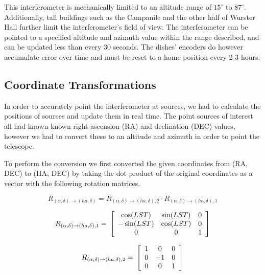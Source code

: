\documentclass{article}
\begin{document}
  This interferometer is mechanically limited to an altitude range of
  $15^{\circ}$ to $87^{\circ}$. Additionally, tall buildings such as the
  Campanile and the other half of Wurster Hall further limit the
  interferometer's field of view. The interferometer can be pointed to a
  specified altitude and azimuth value within the range described, and can be
  updated less than every 30 seconds. The dishes' encoders do however
  accumulate error over time and must be reset to a home position every 2-3
  hours.

  \subsection{Coordinate Transformations}
  In order to accurately point the interferometer at sources, we had to
  calculate the positions of sources and update them in real time. The point
  sources of interest all had known known right ascension (RA) and declination
  (DEC) values, however we had to convert these to an altitude and azimuth in
  order to point the telescope.

  To perform the conversion we first converted the given coordinates from
  (RA, DEC) to (HA, DEC) by taking the dot product of the original coordinates
  as a vector with the following rotation matrices.

   \[ {R}_{(\alpha , \delta ) \rightarrow (ha, \delta )} =
      {R}_{(\alpha , \delta) \rightarrow (ha, \delta ),2} \cdot
      {R}_{(\alpha , \delta ) \rightarrow (ha, \delta ),1} \]

   \[ {R}_{(\alpha , \delta ) \rightarrow (ha, \delta ),1} = \\
       \left [ \begin{array}{ccc}
           \cos(LST) & \sin(LST) & 0 \\
           -\sin(LST) & \cos(LST) & 0 \\
           0 & 0 & 1 \\
       \end{array} \right ]  \]

   \[ {R}_{(\alpha , \delta ) \rightarrow (ha, \delta ),2} = \\
       \left [ \begin{array}{ccc}
           1 & 0 & 0 \\
           0 & -1 & 0 \\
           0 & 0 & 1 \\
       \end{array} \right ]  \]
\end{document}
